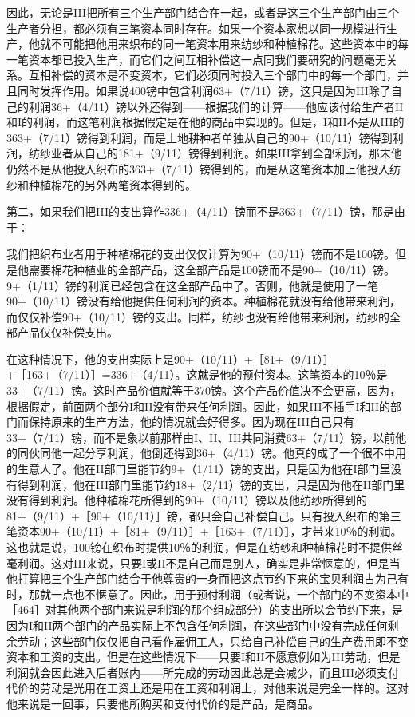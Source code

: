 因此，无论是III把所有三个生产部门结合在一起，或者是这三个生产部门由三个生产者分担，都必须有三笔资本同时存在。如果一个资本家想以同一规模进行生产，他就不可能把他用来织布的同一笔资本用来纺纱和种植棉花。这些资本中的每一笔资本都已投入生产，而它们之间互相补偿这一点同我们要研究的问题毫无关系。互相补偿的资本是不变资本，它们必须同时投入三个部门中的每一个部门，并且同时发挥作用。如果说400镑中包含利润63+（7/11）镑，这只是因为III除了自己的利润36+（4/11）镑以外还得到——根据我们的计算——他应该付给生产者II和I的利润，而这笔利润根据假定是在他的商品中实现的。但是，I和II不是从III的363+（7/11）镑得到利润，而是土地耕种者单独从自己的90+（10/11）镑得到利润，纺纱业者从自己的181+（9/11）镑得到利润。如果III拿到全部利润，那末他仍然不是从他投入织布的363+（7/11）镑得到的，而是从这笔资本加上他投入纺纱和种植棉花的另外两笔资本得到的。

第二，如果我们把III的支出算作336+（4/11）镑而不是363+（7/11）镑，那是由于：

我们把织布业者用于种植棉花的支出仅仅计算为90+（10/11）镑而不是100镑。但是他需要棉花种植业的全部产品，这全部产品是100镑而不是90+（10/11）镑。9+（1/11）镑的利润已经包含在这全部产品中了。否则，他就是使用了一笔90+（10/11）镑没有给他提供任何利润的资本。种植棉花就没有给他带来利润，而仅仅补偿90+（10/11）镑的支出。同样，纺纱也没有给他带来利润，纺纱的全部产品仅仅补偿支出。

在这种情况下，他的支出实际上是90+（10/11）+［81+（9/11）］+［163+（7/11）］=336+（4/11）。这就是他的预付资本。这笔资本的10％是33+（7/11）镑。这时产品价值就等于370镑。这个产品价值决不会更高，因为，根据假定，前面两个部分I和II没有带来任何利润。因此，如果III不插手I和II的部门而保持原来的生产方法，他的情况就会好得多。因为现在III自己只有33+（7/11）镑，而不是象以前那样由I、II、III共同消费63+（7/11）镑，以前他的同伙同他一起分享利润，他倒还得到36+（4/11）镑。他真的成了一个很不中用的生意人了。他在II部门里能节约9+（1/11）镑的支出，只是因为他在I部门里没有得到利润，他在III部门里能节约18+（2/11）镑的支出，只是因为他在II部门里没有得到利润。他种植棉花所得到的90+（10/11）镑以及他纺纱所得到的81+（9/11）+［90+（10/11）］镑，都只会自己补偿自己。只有投入织布的第三笔资本90+（10/11）+［81+（9/11）］+［163+（7/11）］，才带来10％的利润。这也就是说，100镑在织布时提供10％的利润，但是在纺纱和种植棉花时不提供丝毫利润。这对III来说，只要I或II不是自己而是别人，确实是非常惬意的，但是当他打算把三个生产部门结合于他尊贵的一身而把这点节约下来的宝贝利润占为己有时，那就一点也不惬意了。因此，用于预付利润（或者说，一个部门的不变资本中［464］对其他两个部门来说是利润的那个组成部分）的支出所以会节约下来，是因为I和II两个部门的产品实际上不包含任何利润，在这些部门中没有完成任何剩余劳动；这些部门仅仅把自己看作雇佣工人，只给自己补偿自己的生产费用即不变资本和工资的支出。但是在这些情况下——只要I和II不愿意例如为III劳动，但是利润就会因此进入后者账内——所完成的劳动因此总是会减少，而且III必须支付代价的劳动是光用在工资上还是用在工资和利润上，对他来说是完全一样的。这对他来说是一回事，只要他所购买和支付代价的是产品，是商品。

